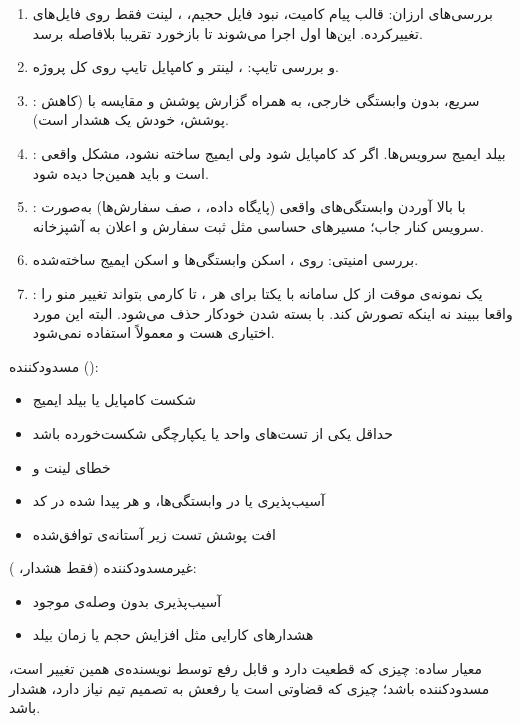 \begin{enumerate}
	\item {بررسی‌های ارزان}: قالب پیام کامیت، نبود فایل حجیم، ، لینت فقط روی فایل‌های تغییرکرده. این‌ها اول اجرا می‌شوند تا بازخورد تقریبا بلافاصله برسد.
	\item { و بررسی تایپ}: ، لینتر و کامپایل تایپ روی کل پروژه.
	\item {}: سریع، بدون وابستگی خارجی، به همراه گزارش پوشش و مقایسه با  (کاهش پوشش، خودش یک هشدار است).
	\item {}: بیلد ایمیج سرویس‌ها. اگر کد کامپایل شود ولی ایمیج ساخته نشود، مشکل واقعی است و باید همین‌جا دیده شود.
	\item {}: با بالا آوردن وابستگی‌های واقعی (پایگاه داده، ، صف سفارش‌ها) به‌صورت سرویس کنار جاب؛ مسیرهای حساسی مثل ثبت سفارش و اعلان به آشپزخانه.
	\item {بررسی امنیتی}:  روی ، اسکن وابستگی‌ها و اسکن ایمیج ساخته‌شده.
	\item {}: یک نمونه‌ی موقت از کل سامانه با  یکتا برای هر ، تا کارمی بتواند تغییر منو را واقعا ببیند نه اینکه تصورش کند. با بسته شدن  خودکار حذف می‌شود.
	البته این مورد اختیاری هست و معمولاً استفاده نمی‌شود.
\end{enumerate}

{مسدودکننده ():}
\begin{itemize}
	\item شکست کامپایل یا بیلد ایمیج
	\item حداقل یکی از تست‌های واحد یا یکپارچگی شکست‌خورده باشد
	\item خطای لینت و 
	\item آسیب‌پذیری  یا  در وابستگی‌ها، و هر  پیدا شده در کد
	\item افت پوشش تست زیر آستانه‌ی توافق‌شده
\end{itemize}

{غیرمسدودکننده (فقط هشدار، ):}
\begin{itemize}
	\item آسیب‌پذیری  بدون وصله‌ی موجود
	\item هشدارهای کارایی مثل افزایش حجم  یا زمان بیلد
\end{itemize}

معیار ساده: چیزی که {قطعیت} دارد و {قابل رفع توسط نویسنده‌ی همین تغییر} است، مسدودکننده باشد؛ چیزی که قضاوتی است یا رفعش به تصمیم تیم نیاز دارد، هشدار باشد.

